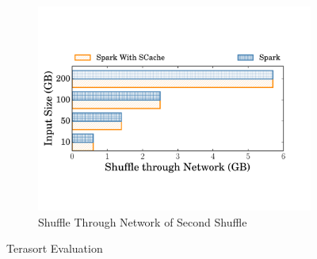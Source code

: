\begin{figure}
\begin{minipage}[b]{.32\linewidth}
\begin{subfigure}{\linewidth}
			\begin{minipage}{\linewidth}
				\includegraphics[width=\linewidth]{fig/tera_shuffle}
				\caption{Shuffle Through Network of Second Shuffle}
				\label{fig:terashuffle}
			\end{minipage}
		\end{subfigure}
		\caption{Terasort Evaluation}
	\end{minipage}
\end{figure}

